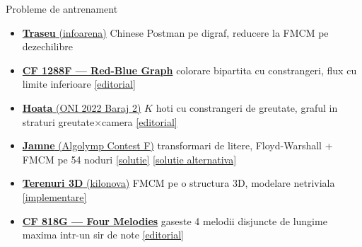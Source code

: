 ﻿\documentclass[9pt]{beamer}
\begin{document}
\begin{frame}{Probleme de antrenament}
  \begin{itemize}
    \footnotesize
    \item \href{https://www.infoarena.ro/problema/traseu}{\textbf{Traseu} (infoarena)}
          \textemdash{} Chinese Postman pe digraf, reducere la FMCM pe dezechilibre
    \smallskip
    \item \href{https://codeforces.com/contest/1288/problem/F}{\textbf{CF 1288F --- Red-Blue Graph}}
          \textemdash{} colorare bipartita cu constrangeri, flux cu limite inferioare
          \quad\href{https://codeforces.com/blog/entry/73105}{[editorial]}
    \smallskip
    \item \href{https://code.algolymp.com/problems/152}{\textbf{Hoata} (ONI 2022 Baraj 2)}
          \textemdash{} $K$ hoti cu constrangeri de greutate, graful in straturi greutate$\times$camera
          \quad\href{https://github.com/roalgo-discord/Romanian-Olympiad-Solutions/blob/main/Baraj\%20\%2B\%20Lot\%20Seniori\%20(IOI\%20team\%20selection\%20tests)/2022/Baraj\%201\%2B2.pdf}{[editorial]}
    \smallskip
    \item \href{https://code.algolymp.com/problems/3450}{\textbf{Jamne} (Algolymp Contest F)}
          \textemdash{} transformari de litere, Floyd-Warshall + FMCM pe 54 noduri
          \quad\href{https://kilonova.ro/pastes/2toYPVYSuFo9}{[solutie]}
          \href{https://kilonova.ro/pastes/vVRWJKiwROrD}{[solutie alternativa]}
    \smallskip
    \item \href{https://kilonova.ro/problems/434}{\textbf{Terenuri 3D} (kilonova)}
          \textemdash{} FMCM pe o structura 3D, modelare netriviala
          \quad\href{https://kilonova.ro/submissions/534618}{[implementare]}
    \smallskip
    \item \href{https://codeforces.com/problemset/problem/818/G}{\textbf{CF 818G --- Four Melodies}}
          \textemdash{} gaseste 4 melodii disjuncte de lungime maxima intr-un sir de note
          \quad\href{https://codeforces.com/blog/entry/52991}{[editorial]}
  \end{itemize}
\end{frame}
\end{document}
